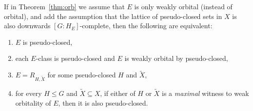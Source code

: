 	
	\begin{thm}
		\label{thm:worb}
		If in Theorem~\ref{thm:orb} we assume that $E$ is only weakly orbital (instead of orbital), and add the assumption that the lattice of pseudo-closed sets in $X$ is also downwards $[G:H_E]$-complete, then the following are equivalent:
		\begin{enumerate}
			\item
			\label{it:thm:worb_1}
			$E$ is pseudo-closed,
			\item
			\label{it:thm:worb_2}
			each $E$-class is pseudo-closed and $E$ is weakly orbital by pseudo-closed,
			\item
			\label{it:thm:worb_3}
			$E=R_{H,\tilde X}$ for some pseudo-closed $H$ and $\tilde X$,
			\item
			\label{it:thm:worb_4}
			for every $H\leq G$ and $\tilde X\subseteq X$, if either of $H$ or $\tilde X$ is a \emph{maximal} witness to weak orbitality of $E$, then it is also pseudo-closed.
		\end{enumerate}
	\end{thm}
